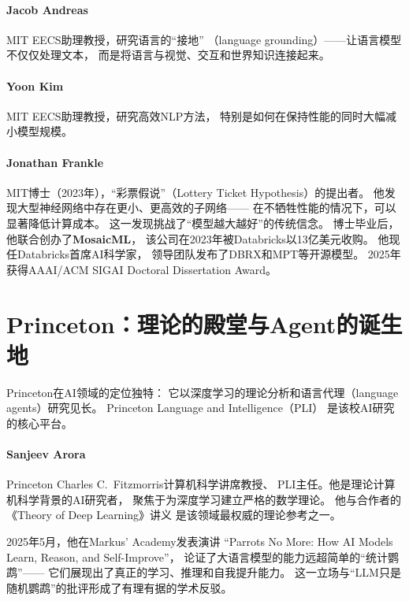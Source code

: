 \paragraph{Jacob Andreas}
MIT EECS助理教授，研究语言的``接地''
（language grounding）——让语言模型不仅仅处理文本，
而是将语言与视觉、交互和世界知识连接起来。

\paragraph{Yoon Kim}
MIT EECS助理教授，研究高效NLP方法，
特别是如何在保持性能的同时大幅减小模型规模。

\paragraph{Jonathan Frankle}
MIT博士（2023年），``彩票假说''（Lottery Ticket Hypothesis）的提出者。
他发现大型神经网络中存在更小、更高效的子网络——
在不牺牲性能的情况下，可以显著降低计算成本。
这一发现挑战了``模型越大越好''的传统信念。
博士毕业后，他联合创办了\textbf{MosaicML}，
该公司在2023年被Databricks以13亿美元收购。
他现任Databricks首席AI科学家，
领导团队发布了DBRX和MPT等开源模型。
2025年获得AAAI/ACM SIGAI Doctoral Dissertation Award。

\section{Princeton：理论的殿堂与Agent的诞生地}
\label{sec:princeton}

Princeton在AI领域的定位独特：
它以深度学习的理论分析和语言代理（language agents）研究见长。
Princeton Language and Intelligence（PLI）
是该校AI研究的核心平台。

\paragraph{Sanjeev Arora}
Princeton Charles C.\ Fitzmorris计算机科学讲席教授、
PLI主任。他是理论计算机科学背景的AI研究者，
聚焦于为深度学习建立严格的数学理论。
他与合作者的《Theory of Deep Learning》讲义
是该领域最权威的理论参考之一。

2025年5月，他在Markus' Academy发表演讲
``Parrots No More: How AI Models Learn, Reason, and Self-Improve''，
论证了大语言模型的能力远超简单的``统计鹦鹉''——
它们展现出了真正的学习、推理和自我提升能力。
这一立场与``LLM只是随机鹦鹉''的批评形成了有理有据的学术反驳。

